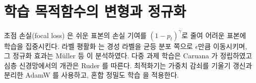 
\section{학습 목적함수의 변형과 정규화}
\label{sec:bg-objectives}

초점 손실(focal loss) \cite{lin2017focal}은 쉬운 표본의 손실 기여를 $(1-p_t)^\gamma$로 줄여 어려운 표본에 학습을 집중시킨다. 라벨 평활화 \cite{szegedy2016rethinking}는 경성 라벨을 균등 분포 쪽으로 $\epsilon$만큼 이동시키며, 그 정규화 효과는 Müller 등 \cite{muller2019when}이 분석하였다. 다중 과제 학습은 Caruana \cite{caruana1997multitask}가 정립하였고 심층 신경망에서의 개관은 Ruder \cite{ruder2017overview}를 따른다. 최적화기는 가중치 감쇠를 기울기 갱신과 분리한 AdamW \cite{loshchilov2019decoupled}를 사용하고, 혼합 정밀도 학습 \cite{micikevicius2018mixed}을 적용한다.
